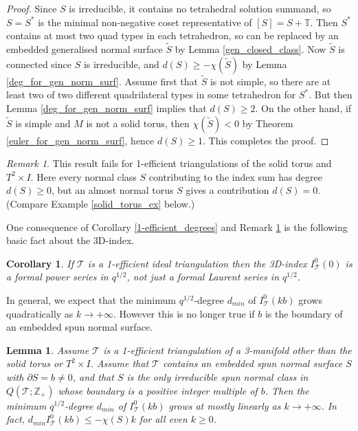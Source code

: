 \documentclass[12pt,reqno]{amsart}  %
\newtheorem{lemma}[thm]{Lemma}
\newtheorem{cor}[thm]{Corollary}
\theoremstyle{definition}
\theoremstyle{remark}
\newtheorem{rmk}[thm]{Remark}
\newcommand{\TT}{\mathbb{T}}
\newcommand{\T}{\mathcal{T}}
\def\Z{\mathbb Z}
\def\bd{\partial}
\def\TT{\mathbb T}   %
\begin{document}
\begin{proof} 
Since $S$ is irreducible, it contains no tetrahedral solution summand, 
so $S=S^*$ is  the minimal non-negative coset representative of $[S]=S+\TT$. 
Then $S^*$  contains at most two quad types in each tetrahedron,
so can be replaced by an embedded generalised normal surface $\tilde S$ 
by Lemma \ref{gen_closed_class}. Now $\tilde S$ is connected since $S$ 
is irreducible, and $d(S) \ge - \chi(\tilde S)$ by 
Lemma \ref{deg_for_gen_norm_surf}.
Assume first that $\tilde S$ is not simple, so there are at least two of 
two different quadrilateral types in some tetrahedron for $S^*$. 
But then Lemma \ref{deg_for_gen_norm_surf} implies that $d(S) \ge 2$.
On the other hand,  if $\tilde S$ is simple and $M$ is not a solid torus, 
then $\chi(\tilde S)<0$ by Theorem \ref{euler_for_gen_norm_surf}, hence 
$d(S) \ge 1$. This completes the proof. 
\end{proof}

\begin{rmk}
\label{solid_torus_T2xI_degrees}
This result fails for 1-efficient triangulations of the solid torus and 
$T^2 \times I$. Here every normal class $S$ contributing to the index sum 
has degree $d(S)\ge 0$, but an almost normal torus $S$ gives a 
contribution $d(S)=0$. (Compare Example \ref{solid_torus_ex} below.)
\end{rmk}

One consequence of Corollary \ref{1-efficient_degrees} and 
Remark \ref{solid_torus_T2xI_degrees} is the following basic fact about 
the 3D-index.

\begin{cor}
If $\T$ is a 1-efficient ideal triangulation then the 3D-index $I_\T^0(0)$
is a formal power series in $q^{1/2}$, not just a formal Laurent series 
in $q^{1/2}$.
\end{cor}

In general, we expect that the minimum $q^{1/2}$-degree $d_{min}$ of 
$I^0_\T(kb)$ grows quadratically as $k \to +\infty$. However this is 
no longer true if $b$ is the boundary of an embedded spun normal surface.

\begin{lemma}
\label{linear_growth}
Assume $\T$ is a 1-efficient triangulation of a 3-manifold other than 
the solid torus or $T^2 \times I$. Assume that $\T$  contains an embedded 
spun normal surface $S$ with $\bd S=b \ne 0$, and 
that $S$ is the only irreducible spun normal class in $Q(\T;\Z_+)$ whose 
boundary is a positive integer multiple of $b$.
Then the minimum $q^{1/2}$-degree $d_{min}$ of $I^0_\T(kb)$ grows at 
mostly linearly as $k \to +\infty$.
In fact, $d_{min} I^0_\T(kb) \le -\chi(S)k$ for all even $k \ge 0$.   
\end{lemma}
\end{document}
